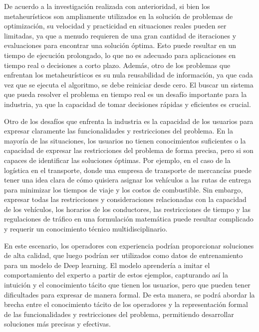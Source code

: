 De acuerdo a la investigación realizada con anterioridad, si bien los metaheurísticos son ampliamente utilizados 
en la solución de problemas de optimización, su velocidad y practicidad en situaciones reales pueden ser limitadas, 
ya que a menudo requieren de una gran cantidad de iteraciones y evaluaciones para encontrar una solución óptima. 
Esto puede resultar en un tiempo de ejecución prolongado, lo que no es adecuado para aplicaciones en tiempo real 
o decisiones a corto plazo. Además, otro de los problemas que enfrentan los metaheurísticos es su nula 
reusabilidad de información, ya que cada vez que se ejecuta el algoritmo, se debe reiniciar desde cero.
El buscar un sistema que pueda resolver el problema en tiempo real es un desafío importante para la 
industria, ya que la capacidad de tomar decisiones rápidas y eficientes es crucial.\medskip 

Otro de los desafíos que enfrenta la industria es la capacidad de los usuarios para expresar claramente las
funcionalidades y restricciones del problema. En la mayoría de las situaciones, los usuarios no tienen conocimientos
suficientes o la capacidad de expresar las restricciones del problema de forma precisa, pero si son capaces de
identificar las soluciones óptimas. Por ejemplo, en el caso de la logística en el transporte, donde una empresa 
de transporte de mercancías puede tener una idea clara de cómo quisiera asignar los vehículos a las rutas de 
entrega para minimizar los tiempos de viaje y los costos de combustible. Sin embargo, expresar todas las 
restricciones y consideraciones relacionadas con la capacidad de los vehículos, los horarios de los conductores, 
las restricciones de tiempo y las regulaciones de tráfico en una formulación matemática puede resultar complicado 
y requerir un conocimiento técnico multidisciplinario.\medskip

En este escenario, los operadores con experiencia podrían proporcionar soluciones de alta calidad, que luego 
podrían ser utilizados como datos de entrenamiento para un modelo de Deep learning. El modelo aprendería 
a imitar el comportamiento del experto a partir de estos ejemplos, capturando así la intuición y el conocimiento 
tácito que tienen los usuarios, pero que pueden tener dificultades para expresar de manera formal. De esta manera, 
se podrá abordar la brecha entre el conocimiento tácito de los operadores y la representación formal de las 
funcionalidades y restricciones del problema, permitiendo desarrollar soluciones más precisas y efectivas.\medskip

